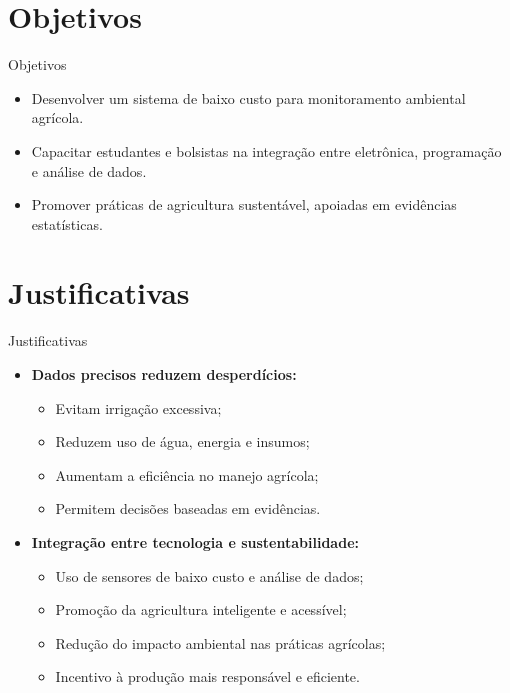 \documentclass{beamer}
\begin{document}

\section{Objetivos}
\begin{frame}{Objetivos}
\begin{itemize}
    \item Desenvolver um sistema de baixo custo para monitoramento ambiental agrícola.
    \item Capacitar estudantes e bolsistas na integração entre eletrônica, programação e análise de dados.
    \item Promover práticas de agricultura sustentável, apoiadas em evidências estatísticas.
\end{itemize}
\end{frame}

\section{Justificativas}
\begin{frame}{Justificativas}
\begin{itemize}

    \item \textbf{Dados precisos reduzem desperdícios:}
    \begin{itemize}
        \item Evitam irrigação excessiva;
        \item Reduzem uso de água, energia e insumos;
        \item Aumentam a eficiência no manejo agrícola;
        \item Permitem decisões baseadas em evidências.
    \end{itemize}

    \item \textbf{Integração entre tecnologia e sustentabilidade:}
    \begin{itemize}
        \item Uso de sensores de baixo custo e análise de dados;
        \item Promoção da agricultura inteligente e acessível;
        \item Redução do impacto ambiental nas práticas agrícolas;
        \item Incentivo à produção mais responsável e eficiente.
    \end{itemize}

\end{itemize}
\end{frame}
\end{document}
